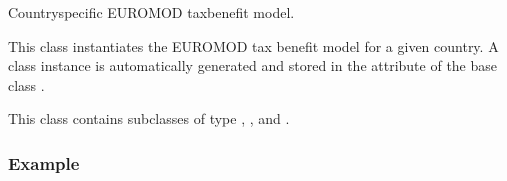 \documentclass[letterpaper,10pt,english]{sphinxmanual}
\begin{document}
\begin{fulllineitems}
\label{\detokenize{autoapi/euromod/core/index:euromod.core.Country}}
\pysigstartsignatures
{}
\pysigstopsignatures
\sphinxAtStartPar
Country\sphinxhyphen{}specific EUROMOD tax\sphinxhyphen{}benefit model.

\sphinxAtStartPar
This class instantiates the EUROMOD tax benefit model for a given country.
A class instance is automatically generated and stored in the attribute
 of the base class {\hyperref[\detokenize{autoapi/euromod/core/index:euromod.core.Model}]{}}.

\sphinxAtStartPar
This class contains subclasses of type {\hyperref[\detokenize{autoapi/euromod/core/index:euromod.core.System}]{}}, {\hyperref[\detokenize{autoapi/euromod/core/index:euromod.core.Policy}]{}},
{\hyperref[\detokenize{autoapi/euromod/core/index:euromod.core.Dataset}]{}} and {\hyperref[\detokenize{autoapi/euromod/core/index:euromod.core.Extension}]{}}.
\subsubsection*{Example}

\begin{sphinxVerbatim}[commandchars=\\\{\}]
   
\PYG{p}{[}\PYG{p}{]}
\end{sphinxVerbatim}

\end{fulllineitems}
\end{document}
